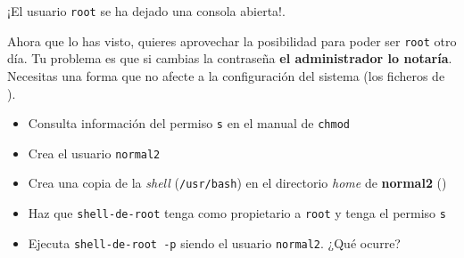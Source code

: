 \begin{homeworkProblem}


  \begin{multicols}{2}

    \null \vfill
    \begin{ActividadAdmin}
      ¡El usuario \texttt{root} se ha dejado una consola abierta!.

      Ahora que lo has visto, quieres aprovechar la posibilidad para poder ser \texttt{root} otro día. Tu problema es que si cambias la contraseña \textbf{el administrador lo notaría}. Necesitas una forma que no afecte a la configuración del sistema (los ficheros de ).
    \end{ActividadAdmin}
    \vfill \null
    \columnbreak



    \begin{ActividadHacker}
      \begin{itemize}
      \item Consulta información del permiso \texttt{s} en el manual de \texttt{chmod}
      \item Crea el usuario \texttt{normal2}
      \item Crea una copia de la \textit{shell} (\texttt{/usr/bash}) en el directorio \textit{home} de \textbf{normal2} ()
      \item Haz que \texttt{shell-de-root} tenga como propietario a \texttt{root} y tenga el permiso \texttt{s}
      \item Ejecuta \texttt{shell-de-root -p} siendo el usuario \texttt{normal2}. ¿Qué ocurre?
      \end{itemize}
    \end{ActividadHacker}

  \end{multicols}

  
\end{homeworkProblem}


